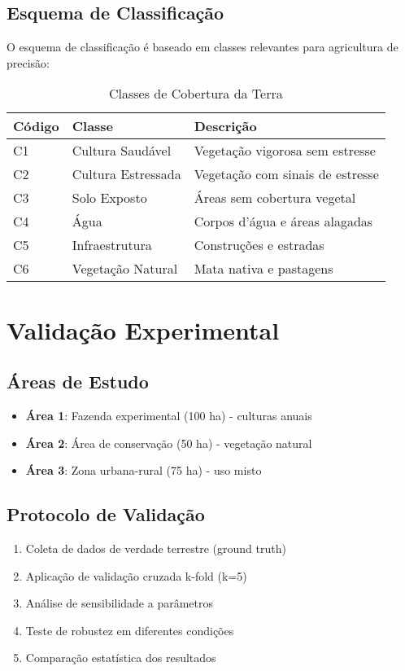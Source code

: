 \subsection{Esquema de Classificação}
O esquema de classificação é baseado em classes relevantes para agricultura de precisão:

\begin{table}[h]
\centering
\caption{Classes de Cobertura da Terra}
\begin{tabular}{|l|l|l|}
\hline
\textbf{Código} & \textbf{Classe} & \textbf{Descrição} \\
\hline
C1 & Cultura Saudável & Vegetação vigorosa sem estresse \\
C2 & Cultura Estressada & Vegetação com sinais de estresse \\
C3 & Solo Exposto & Áreas sem cobertura vegetal \\
C4 & Água & Corpos d'água e áreas alagadas \\
C5 & Infraestrutura & Construções e estradas \\
C6 & Vegetação Natural & Mata nativa e pastagens \\
\hline
\end{tabular}
\label{tab:classes}
\end{table}

\section{Validação Experimental}\label{sec:validacao}

\subsection{Áreas de Estudo}
\begin{itemize}
    \item \textbf{Área 1}: Fazenda experimental (100 ha) - culturas anuais
    \item \textbf{Área 2}: Área de conservação (50 ha) - vegetação natural
    \item \textbf{Área 3}: Zona urbana-rural (75 ha) - uso misto
\end{itemize}

\subsection{Protocolo de Validação}
\begin{enumerate}
    \item Coleta de dados de verdade terrestre (ground truth)
    \item Aplicação de validação cruzada k-fold (k=5)
    \item Análise de sensibilidade a parâmetros
    \item Teste de robustez em diferentes condições
    \item Comparação estatística dos resultados
\end{enumerate}

